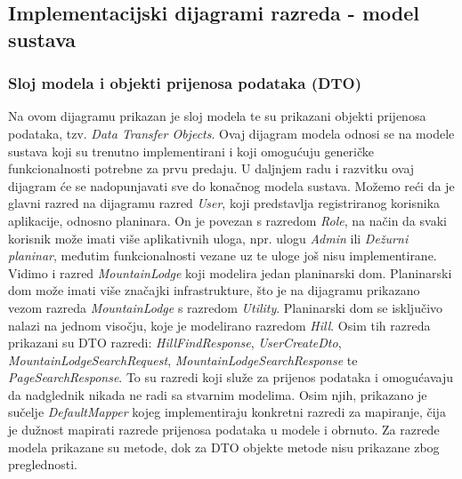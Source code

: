 			\eject
			
			\subsection{Implementacijski dijagrami razreda - model sustava}
			\subsubsection{Sloj modela i objekti prijenosa podataka (DTO)}
			Na ovom dijagramu prikazan je sloj modela te su prikazani objekti prijenosa podataka, tzv. \textit{Data Transfer Objects}. Ovaj dijagram modela odnosi se na modele sustava koji su trenutno implementirani i koji omogućuju generičke funkcionalnosti potrebne za prvu predaju. U daljnjem radu i razvitku ovaj dijagram će se nadopunjavati sve do konačnog modela sustava. Možemo reći da je glavni razred na dijagramu razred \textit{User}, koji predstavlja registriranog korisnika aplikacije, odnosno planinara. On je povezan s razredom \textit{Role}, na način da svaki korisnik može imati više aplikativnih uloga, npr. ulogu \textit{Admin} ili \textit{Dežurni planinar}, međutim funkcionalnosti vezane uz te uloge još nisu implementirane. Vidimo i razred \textit{MountainLodge} koji modelira jedan planinarski dom. Planinarski dom može imati više značajki infrastrukture, što je na dijagramu prikazano vezom razreda \textit{MountainLodge} s razredom \textit{Utility}. Planinarski dom se isključivo nalazi na jednom visočju, koje je modelirano razredom \textit{Hill}. Osim tih razreda prikazani su DTO razredi: \textit{HillFindResponse}, \textit{UserCreateDto}, \textit{MountainLodgeSearchRequest}, \textit{MountainLodgeSearchResponse} te \textit{PageSearchResponse}. To su razredi koji služe za prijenos podataka i omogućavaju da nadglednik nikada ne radi sa stvarnim modelima. Osim njih, prikazano je sučelje \textit{DefaultMapper} kojeg implementiraju konkretni razredi za mapiranje, čija je dužnost mapirati razrede prijenosa podataka u modele i obrnuto. Za razrede modela prikazane su metode, dok za DTO objekte metode nisu prikazane zbog preglednosti.
